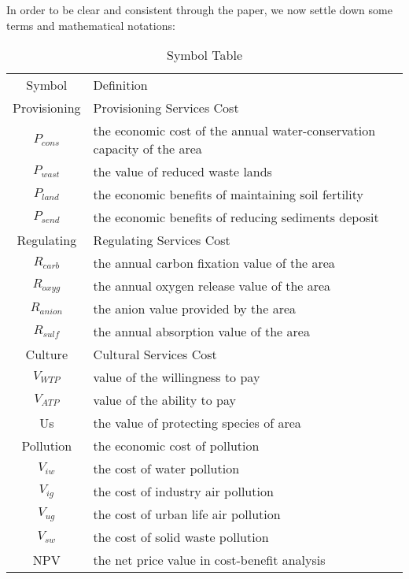 \documentclass{mcmthesis}
\begin{document}
			In order to be clear and consistent through the paper, we now settle down some terms	and mathematical notations:
			
			\begin{table}[h]
				\caption{Symbol Table}
				\centering
				\renewcommand\arraystretch{1.32}
				\begin{tabular}{c l}
					\hline
					Symbol & Definition\\
					\noalign{\global\arrayrulewidth1pt}\hline\noalign{\global\arrayrulewidth0.9pt}

					Provisioning& 	Provisioning Services Cost\\
					$P_{cons}$&	the economic cost of the annual water-conservation capacity of the area\\
					$P_{wast}$&	the value of reduced waste lands \\
					$P_{land}$&	the economic benefits of maintaining soil fertility \\
					$P_{send}$&	the economic benefits of reducing sediments deposit\\
					Regulating&	Regulating Services Cost\\
					$R_{carb}$&	the annual carbon fixation value of the area\\
					$R_{oxyg}$&	the annual oxygen release value of the area\\
					$R_{anion}$&	the anion value provided by the area\\
					$R_{sulf}$&	the annual absorption value of the area\\
					Culture&	Cultural Services Cost\\
					$V_{WTP}$&	value of the willingness to pay\\
					$V_{ATP}$&	value of the ability to pay\\
					Us&	the value of protecting species of area\\
					Pollution&	the economic cost of pollution\\
					$V_{iw}$&	the cost of water pollution \\
					$V_{ig}$&	the cost of industry air pollution\\
					$V_{ug}$&	the cost of urban life air pollution\\
					$V_{sw}$&	the cost of solid waste pollution\\
					NPV&	the net price value in cost-benefit analysis\\


					\hline
					
				\end{tabular}
			\end{table}
			
\end{document}
